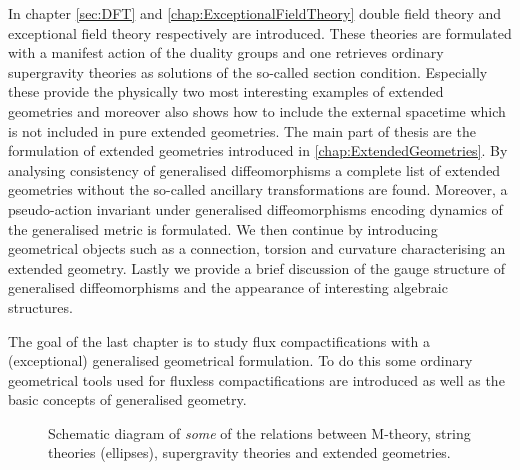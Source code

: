 In chapter \ref{sec:DFT} and \ref{chap:ExceptionalFieldTheory} double field theory and exceptional field theory respectively are introduced. These theories are formulated with a manifest action of the duality groups and one retrieves ordinary supergravity theories as solutions of the so-called section condition. Especially these provide the physically two most interesting examples of extended geometries and moreover also shows how to include the external spacetime which is not included in pure extended geometries. The main part of thesis are the formulation of extended geometries introduced in \ref{chap:ExtendedGeometries}. By analysing consistency of generalised diffeomorphisms a complete list of extended geometries without the so-called ancillary transformations are found. Moreover, a pseudo-action invariant under generalised diffeomorphisms encoding dynamics of the generalised metric is formulated. We then continue by introducing geometrical objects such as a connection, torsion and curvature characterising an extended geometry. Lastly we provide a brief discussion of the gauge structure of generalised diffeomorphisms and the appearance of interesting algebraic structures. 

The goal of the last chapter is to study flux compactifications with a (exceptional) generalised geometrical formulation. To do this some ordinary geometrical tools used for fluxless compactifications are introduced as well as the basic concepts of generalised geometry. %





\begin{figure}
    \caption{Schematic diagram of \emph{some} of the relations between M-theory, string theories (ellipses), supergravity theories and extended geometries.}
    \label{fig:TheGodFather}
\end{figure}


